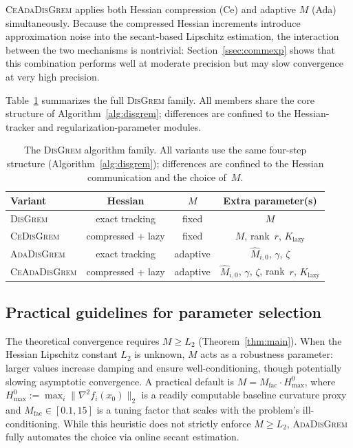 \documentclass[review,onefignum,onetabnum]{siamart171218}
\begin{document}
	\textsc{CeAdaDisGrem} applies both Hessian compression (Ce) and
	adaptive $M$ (Ada) simultaneously.
	Because the compressed Hessian increments introduce approximation noise
	into the secant-based Lipschitz estimation, the interaction between
	the two mechanisms is nontrivial: Section~\ref{ssec:commexp} shows
	that this combination performs well at moderate precision but may slow
	convergence at very high precision.
	
	Table~\ref{tab:family} summarizes the full \textsc{DisGrem} family.
	All members share the core structure of Algorithm~\ref{alg:disgrem};
	differences are confined to the Hessian-tracker and
	regularization-parameter modules.
	
	\begin{table}[htbp]
		\centering
		\caption{The \textsc{DisGrem} algorithm family.
			All variants use the same four-step structure (Algorithm~\ref{alg:disgrem});
			differences are confined to the Hessian communication and the choice of~$M$.}
		\label{tab:family}
		\setlength{\tabcolsep}{4pt}
		\small
		\begin{tabular}{lccc}
			\toprule
			Variant & Hessian & $M$ & Extra parameter(s) \\
			\midrule
			\textsc{DisGrem}       & exact tracking       & fixed  & $M$ \\
			\textsc{CeDisGrem}     & compressed + lazy     & fixed  & $M$, rank~$r$, $K_{\mathrm{lazy}}$ \\
			\textsc{AdaDisGrem}    & exact tracking       & adaptive & $\hat M_{i,0}$, $\gamma$, $\zeta$ \\
			\textsc{CeAdaDisGrem}  & compressed + lazy     & adaptive & $\hat M_{i,0}$, $\gamma$, $\zeta$, rank~$r$, $K_{\mathrm{lazy}}$ \\
			\bottomrule
		\end{tabular}
	\end{table}
	
	\subsection{Practical guidelines for parameter selection}\label{ssec:practical}
	
	The theoretical convergence requires $M\ge L_2$
	(Theorem~\ref{thm:main}).
	When the Hessian Lipschitz constant $L_2$ is unknown, $M$ acts as a
	robustness parameter: larger values increase damping and ensure
	well-conditioning, though potentially slowing asymptotic convergence.
	A practical default is
	$M = M_{\mathrm{fac}} \cdot H_{\max}^{0}$, where
	$H_{\max}^{0} := \max_i\|\nabla^2 f_i(x_0)\|_2$ is a readily
	computable baseline curvature proxy and
	$M_{\mathrm{fac}} \in [0.1, 15]$ is a tuning factor that scales
	with the problem's ill-conditioning.
	While this heuristic does not strictly enforce $M\ge L_2$,
	\textsc{AdaDisGrem} fully automates the choice via online secant
	estimation.
	
\end{document}
